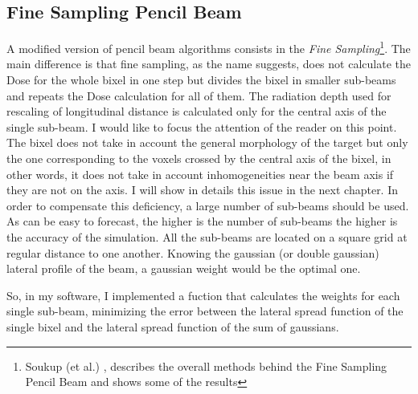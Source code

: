 \documentclass[12pt, a4paper, twoside]{book}
\begin{document}
\subsection{Fine Sampling Pencil Beam}
A modified version of pencil beam algorithms consists in the \emph{Fine Sampling}\footnote{Soukup (et al.) \cite{souk:pba}, describes the overall methods behind the Fine Sampling Pencil Beam and shows some of the results}. The main difference is that fine sampling, as the name suggests, does not calculate the Dose for the whole bixel in one step but divides the bixel in smaller sub-beams and repeats the Dose calculation for all of them. The radiation depth used for rescaling of longitudinal distance is calculated only for the central axis of the single sub-beam. 
I would like to focus the attention of the reader on this point. The bixel does not take in account the general morphology of the target but only the one corresponding to the voxels crossed by the central axis of the bixel, in other words, it does not take in account inhomogeneities near the beam axis if they are not on the axis. I will show in details this issue in the next chapter.
In order to compensate this deficiency, a large number of sub-beams should be used. 
As can be easy to forecast, the higher is the number of sub-beams the higher is the accuracy of the simulation. All the sub-beams are located on a square grid at regular distance to one another. Knowing the gaussian (or double gaussian) lateral profile of the beam, a gaussian weight would be the optimal one.

So, in my software, I implemented a fuction that calculates the weights for each single sub-beam, minimizing the error between the lateral spread function of the single bixel and the lateral spread function of the sum of gaussians.
\end{document}
